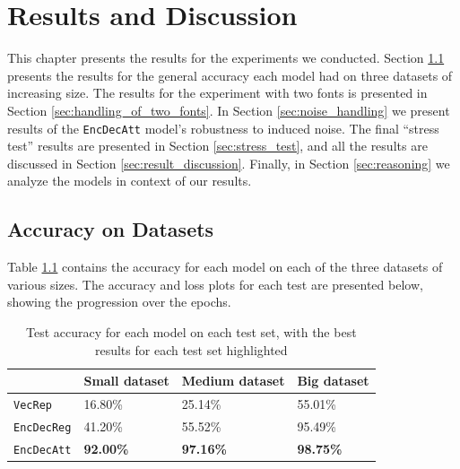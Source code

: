 
\chapter{Results and Discussion}
\label{ch:results}
This chapter presents the results for the experiments we conducted. Section \ref{sec:accuracy_on_datasets_results} presents the results for the general accuracy each model had on three datasets of increasing size. The results for the experiment with two fonts is presented in Section \ref{sec:handling_of_two_fonts}. In Section \ref{sec:noise_handling} we present results of the {\tt EncDecAtt} model's robustness to induced noise. The final ``stress test'' results are presented in Section \ref{sec:stress_test}, and all the results are discussed in Section \ref{sec:result_discussion}. Finally, in Section \ref{sec:reasoning} we analyze the models in context of our results.


\section{Accuracy on Datasets}
\label{sec:accuracy_on_datasets_results}
Table \ref{table:accuracy_model_data_sets} contains the accuracy for each model on each of the three datasets of various sizes. The accuracy and loss plots for each test are presented below, showing the progression over the epochs.

\begin{table}[H]
    \centering
    \begin{tabular}{|l|l|l|l|}
        \hline 
                                        & \textbf{Small dataset}          & \textbf{Medium dataset}         & \textbf{Big dataset}            \\ \hline
        {\tt VecRep }                   & 16.80\%                         & 25.14\%                         & 55.01\%                         \\ \hline
        {\tt EncDecReg}                 & 41.20\%                         & 55.52\%                         & 95.49\%                         \\ \hline
        {\tt EncDecAtt}                 & \textbf{92.00\%}                & \textbf{97.16\%}                & \textbf{98.75\%}                \\ \hline
    \end{tabular}
    \captionsetup{justification=centering}
    \caption{Test accuracy for each model on each test set, with the best results for each test set highlighted}
    \label{table:accuracy_model_data_sets}
\end{table}

